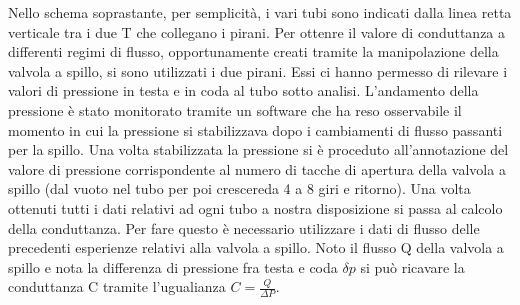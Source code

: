\documentclass[a4paper,11pt]{article}
\begin{document}
Nello schema soprastante, per semplicità, i vari tubi sono indicati dalla linea retta verticale tra i due T che collegano i pirani.
Per ottenre il valore di conduttanza a differenti regimi di flusso, opportunamente creati tramite la manipolazione della valvola a spillo, si sono utilizzati i due pirani. Essi ci hanno permesso di rilevare i valori di pressione in testa e in coda al tubo sotto analisi. L'andamento della pressione è stato monitorato tramite un software che ha reso osservabile il momento in cui la pressione si stabilizzava dopo i cambiamenti di flusso passanti per la spillo. Una volta stabilizzata la pressione si è proceduto all'annotazione del valore di pressione corrispondente al numero di tacche di apertura della valvola a spillo (dal vuoto nel tubo per poi crescereda 4 a 8 giri e ritorno).
Una volta ottenuti tutti i dati relativi ad ogni tubo a nostra disposizione si passa al calcolo della conduttanza. Per fare questo è necessario utilizzare i dati di flusso delle precedenti esperienze relativi alla valvola a spillo. Noto il flusso Q della valvola a spillo e nota la differenza di pressione fra testa e coda $\delta p$ si può ricavare la conduttanza C tramite l'ugualianza $ C = \frac{Q}{\Delta P} $.\\
 
\end{document}
